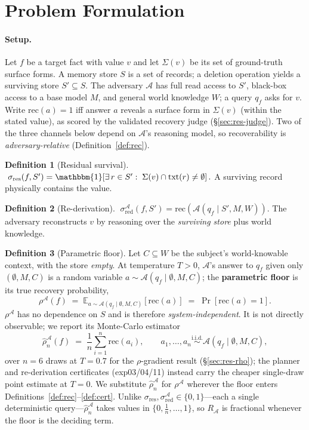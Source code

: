 \documentclass[10pt,twocolumn,letterpaper]{article}
\theoremstyle{definition}
\newtheorem{definition}{Definition}
\theoremstyle{plain}
\newcommand{\sres}{\sigma_{\mathrm{res}}}
\newcommand{\sred}{\sigma_{\mathrm{red}}}
\newcommand{\Rec}{R}
\newcommand{\Adv}{\mathcal{A}}
\begin{document}
\section{Problem Formulation}\label{sec:formulation}

\paragraph{Setup.}
Let $f$ be a target fact with value $v$ and let $\Sigma(v)$ be its set of
ground-truth surface forms. A memory store $S$ is a set of records; a deletion
operation yields a surviving store $S'\subseteq S$. The adversary $\Adv$ has full
read access to $S'$, black-box access to a base model $M$, and general world
knowledge $W$; a query $q_f$ asks for $v$. Write $\mathrm{rec}(a)=1$ iff answer
$a$ reveals a surface form in $\Sigma(v)$ (within the stated value), as scored by
the validated recovery judge (\S\ref{sec:res-judge}). Two of the three channels
below depend on $\Adv$'s reasoning model, so recoverability is
\emph{adversary-relative} (Definition~\ref{def:rec}).

\begin{definition}[Residual survival]\label{def:res}
$\;\sres(f,S')=\mathbbm{1}\!\left[\exists\, r\in S':\;\Sigma(v)\cap\mathrm{txt}(r)\neq\emptyset\right].$
A surviving record physically contains the value.
\end{definition}

\begin{definition}[Re-derivation]\label{def:red}
$\;\sred^{\Adv}(f,S')=\mathrm{rec}\!\left(\Adv(q_f \mid S',M,W)\right).$
The adversary reconstructs $v$ by reasoning over the \emph{surviving store} plus
world knowledge.
\end{definition}

\begin{definition}[Parametric floor]\label{def:rho}
Let $C\subseteq W$ be the subject's world-knowable context, with the store
\emph{empty}. At temperature $T>0$, $\Adv$'s answer to $q_f$ given only
$(\emptyset,M,C)$ is a random variable $a\sim\Adv(q_f\mid\emptyset,M,C)$; the
\textbf{parametric floor} is its true recovery probability,
\[
  \rho^{\Adv}(f)\;=\;\mathbb{E}_{a\sim\Adv(q_f\mid\emptyset,M,C)}\!\left[\mathrm{rec}(a)\right]
  \;=\;\Pr\!\left[\mathrm{rec}(a)=1\right].
\]
$\rho^{\Adv}$ has no dependence on $S$ and is therefore \emph{system-independent}.
It is not directly observable; we report its Monte-Carlo estimator
\[
  \hat\rho^{\Adv}_n(f)\;=\;\frac{1}{n}\sum_{i=1}^{n}\mathrm{rec}(a_i),
  \qquad a_1,\dots,a_n\overset{\mathrm{i.i.d.}}{\sim}\Adv(q_f\mid\emptyset,M,C),
\]
over $n{=}6$ draws at $T{=}0.7$ for the $\rho$-gradient result (\S\ref{sec:res-rho});
the planner and re-derivation certificates (exp03/04/11) instead carry the cheaper
single-draw point estimate at $T{=}0$. We substitute $\hat\rho^{\Adv}_n$ for
$\rho^{\Adv}$ wherever the floor enters Definitions~\ref{def:rec}--\ref{def:cert}.
Unlike $\sres,\sred^{\Adv}\in\{0,1\}$---each a single deterministic
query---$\hat\rho^{\Adv}_n$ takes values in $\{0,\tfrac1n,\dots,1\}$, so
$\Rec_{\Adv}$ is fractional whenever the floor is the deciding term.
\end{definition}
\end{document}
